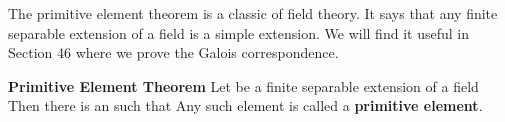 \documentclass[11pt,oneside]{article}
\begin{document}
\begin{BookBody}

\noindent The primitive element theorem is a classic of field theory. It says that any finite separable extension of a field is a simple extension. We will find it useful in Section 46 where we prove the Galois correspondence.

 \textbf{Primitive Element Theorem} Let  be a finite separable extension of a field  Then there is an  such that  Any such element \BookInline{\alpha } is called a\textbf{ primitive element}.

\end{BookBody}

\BookNarrativetrue
\end{document}
